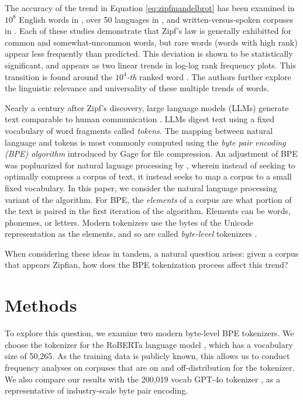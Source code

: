 \documentclass[11pt]{article}
\begin{document}
The accuracy of the trend in Equation \ref{eq:zipfmandelbrot} has been examined in $10^8$ English words in \cite{cancho2000}, over 50 languages in \cite{yu2018zipfslaw50languages}, and written-versus-spoken corpuses in \cite{lin2015scalinglawshumanspeech}. Each of these studies demonstrate that Zipf's law is generally exhibitted for common and somewhat-uncommon words, but rare words (words with high rank) appear less frequently than predicted. This deviation is shown to be statistically significant, and appears as two linear trends in log-log rank frequency plots. This transition is found around the $10^4$\textit{-th} ranked word \cite{cancho2000} \cite{yu2018zipfslaw50languages}. The authors further explore the linguistic relevance and universality of these multiple trends of words. 

Nearly a century after Zipf's discovery, large language models (LLMs) generate text comparable to human communication \cite{llmturingtest}. LLMs digest text using a fixed vocabulary of word fragments called \textit{tokens}. The mapping between natural language and tokens is most commonly computed using the \textit{byte pair encoding (BPE) algorithm} introduced by Gage \cite{bpegage} for file compression. An adjustment of BPE was popluarized for natural laguage processing by \cite{sennrich2016neuralmachinetranslationrare}, wherein instead of seeking to optimally compress a corpus of text, it instead seeks to map a corpus to a small fixed vocabulary. In this paper, we consider the natural language processing variant of the algorithm. For BPE, the \textit{elements} of a corpus are what portion of the text is paired in the first iteration of the algorithm. Elements can be words, phonemes, or letters. Modern tokenizers use the bytes of the Unicode representation as the elements, and so are called \textit{byte-level} tokenizers \cite{radford2019language}. 

When considering these ideas in tandem, a natural question arises: given a corpus that appears Zipfian, how does the BPE tokenization process affect this trend?

\section{Methods}

To explore this question, we examine two modern byte-level BPE tokenizers. We choose the tokenizer for the RoBERTa language model \cite{liu2019robertarobustlyoptimizedbert}, which has a vocabulary size of 50,265. As the training data is publicly known, this allows us to conduct frequency analyses on corpuses that are on and off-distribution for the tokenizer.  We also compare our results with the 200,019 vocab GPT-4o tokenizer \cite{openai2024gpt4technicalreport}, as a representative of industry-scale byte pair encoding. 
\end{document}
